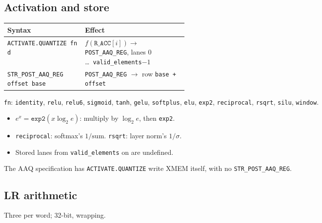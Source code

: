 \documentclass[11pt,a4paper]{article}
\begin{document}
\subsection{Activation and store}

\begin{center}
\small
\begin{tabularx}{\linewidth}{>{\raggedright\arraybackslash}p{0.43\linewidth}>{\raggedright\arraybackslash}X}
\toprule
Syntax & Effect \\
\midrule
\texttt{ACTIVATE.QUANTIZE fn d} & $f(\texttt{R\_ACC}[i]) \rightarrow$
\texttt{POST\_AAQ\_REG}, lanes 0 \ldots\ \texttt{valid\_elements}$-1$ \\
\texttt{STR\_POST\_AAQ\_REG offset base} & \texttt{POST\_AAQ\_REG}
$\rightarrow$ row \texttt{base + offset} \\
\bottomrule
\end{tabularx}
\end{center}

\texttt{fn}: \texttt{identity}, \texttt{relu}, \texttt{relu6},
\texttt{sigmoid}, \texttt{tanh}, \texttt{gelu}, \texttt{softplus},
\texttt{elu}, \texttt{exp2}, \texttt{reciprocal}, \texttt{rsqrt},
\texttt{silu}, \texttt{window}.

\begin{itemize}
\item $e^x = \mathtt{exp2}(x \log_2 e)$: multiply by $\log_2 e$, then
  \texttt{exp2}.
\item \texttt{reciprocal}: softmax's $1/\mathrm{sum}$. \texttt{rsqrt}: layer
  norm's $1/\sigma$.
\item Stored lanes from \texttt{valid\_elements} on are undefined.
\end{itemize}

\begin{openq}
The AAQ specification has \texttt{ACTIVATE.QUANTIZE} write XMEM itself, with no
\texttt{STR\_POST\_AAQ\_REG}.
\end{openq}

\subsection{LR arithmetic}

Three per word; 32-bit, wrapping.
\end{document}
